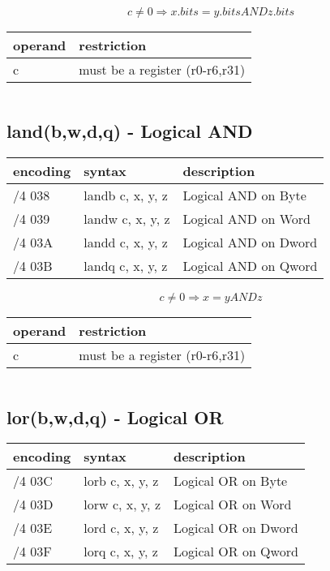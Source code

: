 \documentclass[letterpaper,10pt,openright,twoside,onecolumn]{book}
\begin{document}
  \begin{displaymath} c \neq 0 \Rightarrow x.bits = y.bits AND z.bits\end{displaymath}

  \flushleft
  \begin{tabular}{|l|l|}
   \hline
    operand & restriction \\
   \hline
    c & must be a register (r0-r6,r31) \\
   \hline
  \end{tabular}
  \begin{verbatim}
  \end{verbatim}

\newpage\subsection{land(b,w,d,q) - Logical AND}
  \begin{tabular}{|l|l|l|}
   \hline
    encoding & syntax & description \\
   \hline
    /4 038 & landb c, x, y, z & Logical AND on Byte \\
    /4 039 & landw c, x, y, z & Logical AND on Word \\
    /4 03A & landd c, x, y, z & Logical AND on Dword \\
    /4 03B & landq c, x, y, z & Logical AND on Qword\\
   \hline
  \end{tabular}

  \begin{displaymath} c \neq 0 \Rightarrow x = y AND z\end{displaymath}

  \flushleft
  \begin{tabular}{|l|l|}
   \hline
    operand & restriction \\
   \hline
    c & must be a register (r0-r6,r31) \\
   \hline
  \end{tabular}
  \begin{verbatim}
  \end{verbatim}

\newpage\subsection{lor(b,w,d,q) - Logical OR}
  \begin{tabular}{|l|l|l|}
   \hline
    encoding & syntax & description \\
   \hline
    /4 03C & lorb c, x, y, z & Logical OR on Byte \\
    /4 03D & lorw c, x, y, z & Logical OR on Word \\
    /4 03E & lord c, x, y, z & Logical OR on Dword \\
    /4 03F & lorq c, x, y, z & Logical OR on Qword \\
   \hline
  \end{tabular}
\end{document}
